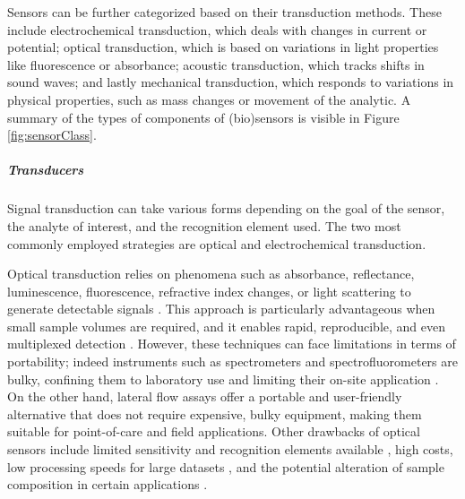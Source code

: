 Sensors can be further categorized based on their transduction methods. These
include electrochemical transduction, which deals with changes in current or
potential; optical transduction, which is based on variations in light
properties like fluorescence or absorbance; acoustic transduction, which tracks
shifts in sound waves; and lastly mechanical transduction, which responds to
variations in physical properties, such as mass changes or movement of the
analytic. A summary of the types of components of (bio)sensors is visible in
Figure \ref{fig:sensorClass}.

\subparagraph{Transducers}
Signal transduction can take various forms depending on the goal of the sensor,
the analyte of interest, and the recognition element used. The two most commonly
employed strategies are optical and electrochemical transduction.

Optical transduction relies on phenomena such as absorbance, reflectance,
luminescence, fluorescence, refractive index changes, or light scattering to
generate detectable signals \citep{danchukOptical2020}. This approach is
particularly advantageous when small sample volumes are required, and it enables
rapid, reproducible, and even multiplexed detection \citep{chenOptical2020}.
However, these techniques can face limitations in terms of portability; indeed
instruments such as spectrometers and spectrofluorometers are bulky, confining
them to laboratory use and limiting their on-site application
\citep{elsherifOptical2022}. On the other hand, lateral flow assays offer a
portable and user-friendly alternative that does not require expensive, bulky
equipment, making them suitable for point-of-care and field applications. Other
drawbacks of optical sensors include limited sensitivity and recognition
elements available \citep{yanReview2018}, high costs, low processing speeds for
large datasets \citep{al-ashwalDeep2023}, and the potential alteration of sample
composition in certain applications \citep{ignestiNew2016}.

